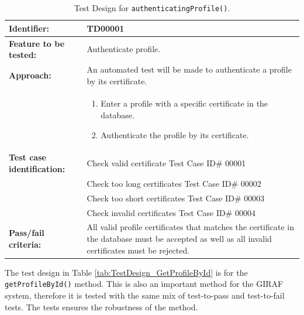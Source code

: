 \begin{table}[htbp]
	\centering
		\begin{tabular}{| p{4.5cm} | m{9cm} |}
			\hline
			\textbf{Identifier:} 				& TD00001 \\ \hline
			\textbf{Feature to be tested:}		& Authenticate profile. \\ \hline
			\textbf{Approach:}					& An automated test will be made to authenticate a profile by its certificate. \\
												&	\begin{enumerate}
														\item Enter a profile with a specific certificate in the database.
														\item Authenticate the profile by its certificate.
													\end{enumerate} \\ \hline
			\textbf{Test case identification:} 	& Check valid certificate Test Case ID\# 00001 \\
												& Check too long certificates Test Case ID\# 00002 \\
												& Check too short certificates Test Case ID\# 00003 \\
												& Check invalid certificates Test Case ID\# 00004 \\ \hline
			\textbf{Pass/fail criteria:}			& All valid profile certificates that matches the certificate in the database must be accepted as well as all invalid certificates must be rejected. \\ \hline
		\end{tabular}
	\caption{Test Design for \texttt{authenticatingProfile()}.}
	\label{tab:TestDesign_AuthenticateProfile}
\end{table}

The test design in Table \vref{tab:TestDesign_GetProfileById} is for the \texttt{getProfileById()} method.
This is also an important method for the GIRAF system, therefore it is tested with the same mix of test-to-pass and test-to-fail tests.
The tests ensures the robustness of the method.

